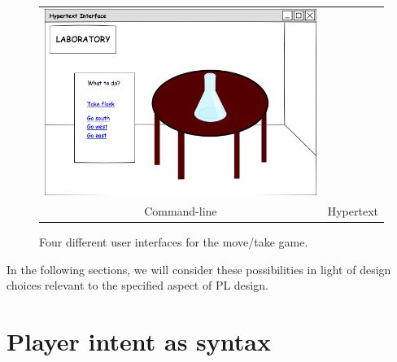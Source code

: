 \begin{figure}
\begin{tabular}{cc}
    \includegraphics[height=0.2\textheight]{../uis/hypertext.png}\\
    Command-line & Hypertext
  \end{tabular}
  \caption{Four different user interfaces for the move/take game.}
  \label{fig:uis}
  \end{figure}

  In the following sections, we will consider these possibilities in light
  of design choices relevant to the specified aspect of PL design.

  \section{Player intent as syntax}
  \label{sec:syntax}


